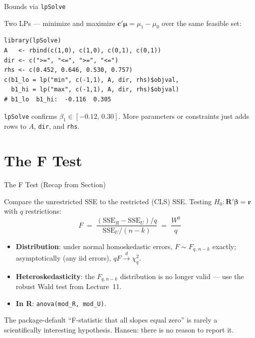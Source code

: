 \documentclass[handout, aspectratio=169]{beamer}
\numberwithin{equation}{section}
\begin{document}
\begin{frame}[fragile]{Bounds via \texttt{lpSolve}}

Two LPs — minimize and maximize $\bm{c}'\bm{\mu} = \mu_1 - \mu_0$ over the same feasible set:

\begin{lstlisting}
library(lpSolve)
A   <- rbind(c(1,0), c(1,0), c(0,1), c(0,1))
dir <- c(">=", "<=", ">=", "<=")
rhs <- c(0.452, 0.646, 0.530, 0.757)
c(b1_lo = lp("min", c(-1,1), A, dir, rhs)$objval,
  b1_hi = lp("max", c(-1,1), A, dir, rhs)$objval)
# b1_lo  b1_hi:  -0.116  0.305
\end{lstlisting}

\pause
\begin{tcolorbox}[colback=blue!5, colframe=blue!50]
\texttt{lpSolve} confirms $\beta_1 \in [-0.12,\,0.30]$.  More parameters or constraints just adds rows to $A$, \texttt{dir}, and \texttt{rhs}.
\end{tcolorbox}
\end{frame}

\section{The F Test}
\setcounter{subsection}{1}

\begin{frame}{The F Test (Recap from Section)}

Compare the unrestricted SSE to the restricted (CLS) SSE.  Testing $H_0\colon \bm{R}'\bm{\beta} = \bm{r}$ with $q$ restrictions:
$$F \;=\; \frac{(\text{SSE}_R - \text{SSE}_U)/q}{\text{SSE}_U/(n-k)} \;=\; \frac{W^0}{q}$$

\pause
\smallskip

\begin{itemize}
\item \textbf{Distribution}: under normal homoskedastic errors, $F \sim F_{q,\,n-k}$ exactly; asymptotically (any iid errors), $qF \xrightarrow{d} \chi^2_q$.
\item \textbf{Heteroskedasticity}: the $F_{q,n-k}$ distribution is no longer valid — use the robust Wald test from Lecture~11.
\item \textbf{In R}: \texttt{anova(mod\_R, mod\_U)}.
\end{itemize}

\pause
\smallskip

\begin{tcolorbox}[colback=blue!5, colframe=blue!50]
The package-default ``F-statistic that all slopes equal zero'' is rarely a scientifically interesting hypothesis. Hansen: there is no reason to report it.
\end{tcolorbox}
\end{frame}
\end{document}
